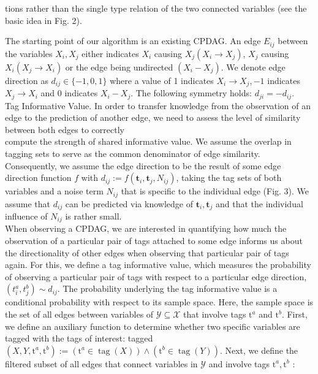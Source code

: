 \documentclass[10pt]{article}
\begin{document}
tions rather than the single type relation of the two connected variables (see the basic idea in Fig. 2).

The starting point of our algorithm is an existing CPDAG. An edge $E_{i j}$ between the variables $X_{i}, X_{j}$ either indicates $X_{i}$ causing $X_{j}\left(X_{i} \rightarrow X_{j}\right)$, $X_{j}$ causing $X_{i}\left(X_{j} \rightarrow X_{i}\right)$ or the edge being undirected $\left(X_{i}-X_{j}\right)$. We denote edge direction as $d_{i j} \in\{-1,0,1\}$ where a value of 1 indicates $X_{i} \rightarrow X_{j},-1$ indicates $X_{j} \rightarrow X_{i}$ and 0 indicates $X_{i}-X_{j}$. The following symmetry holds: $d_{j i}=-d_{i j}$.\\
Tag Informative Value. In order to transfer knowledge from the observation of an edge to the prediction of another edge, we need to assess the level of similarity between both edges to correctly\\
compute the strength of shared informative value. We assume the overlap in tagging sets to serve as the common denominator of edge similarity. Consequently, we assume the edge direction to be the result of some edge direction function $f$ with $d_{i j}:=f\left(\mathbf{t}_{i}, \mathbf{t}_{j}, N_{i j}\right)$, taking the tag sets of both variables and a noise term $N_{i j}$ that is specific to the individual edge (Fig. 3). We assume that $d_{i j}$ can be predicted via knowledge of $\mathbf{t}_{i}, \mathbf{t}_{j}$ and that the individual influence of $N_{i j}$ is rather small.\\
When observing a CPDAG, we are interested in quantifying how much the observation of a particular pair of tags attached to some edge informs us about the directionality of other edges when observing that particular pair of tags again. For this, we define a tag informative value, which measures the probability of observing a particular pair of tags with respect to a particular edge direction, $\left(t_{i}^{a}, t_{j}^{b}\right) \sim d_{i j}$. The probability underlying the tag informative value is a conditional probability with respect to its sample space. Here, the sample space is the set of all edges between variables of $\mathcal{Y} \subseteq \mathcal{X}$ that involve tags $\mathrm{t}^{a}$ and $\mathrm{t}^{b}$. First, we define an auxiliary function to determine whether two specific variables are tagged with the tags of interest: tagged $\left(X, Y, \mathrm{t}^{a}, \mathrm{t}^{b}\right):=\left(\mathrm{t}^{a} \in \operatorname{tag}(X)\right) \wedge\left(\mathrm{t}^{b} \in \operatorname{tag}(Y)\right)$. Next, we define the filtered subset of all edges that connect variables in $\mathcal{Y}$ and involve tags $\mathrm{t}^{a}, \mathrm{t}^{b}$ :
\end{document}

